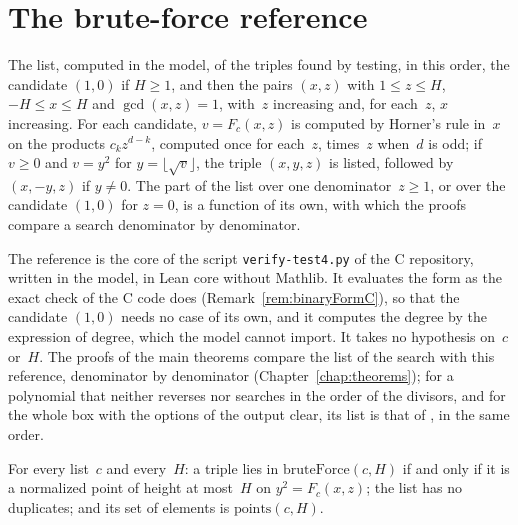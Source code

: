 \section{The brute-force reference}\label{sec:specBruteForce}

\begin{definition}\label{def:bruteForce}
  \leanok
  The list, computed in the model, of the triples found by testing, in this order, the candidate
  $(1, 0)$ if $H \ge 1$, and then the pairs $(x, z)$ with $1 \le z \le H$, $-H \le x \le H$ and
  $\gcd(x, z) = 1$, with~$z$ increasing and, for each~$z$, $x$ increasing. For each candidate,
  $v = F_c(x, z)$ is computed by Horner's rule in~$x$ on the products $c_k z^{d-k}$, computed once
  for each~$z$, times~$z$ when~$d$ is odd; if $v \ge 0$ and $v = y^2$ for
  $y = \lfloor \sqrt{v} \rfloor$, the triple $(x, y, z)$ is listed, followed by $(x, -y, z)$ if
  $y \ne 0$. The part of the list over one denominator~$z \ge 1$, or over the candidate $(1, 0)$
  for $z = 0$, is a function of its own, with which the proofs compare a search denominator by
  denominator.
\end{definition}

The reference is the core of the script \verb|verify-test4.py| of the C repository, written in the
model, in Lean core without Mathlib. It evaluates the form as the exact check of the C code does
(Remark~\ref{rem:binaryFormC}), so that the candidate $(1, 0)$ needs no case of its own, and it
computes the degree by the expression of $\mathrm{degree}$, which the model cannot import. It takes
no hypothesis on~$c$ or~$H$. The proofs of the main theorems compare the list of the search with
this reference, denominator by denominator (Chapter~\ref{chap:theorems}); for a polynomial that
\ratpoints{} neither reverses nor searches in the order of the divisors, and for the whole box with the
options of the output clear, its list is that of \ratpoints{}, in the same order.

\begin{theorem}\label{thm:bruteForce}
  \leanok
  For every list~$c$ and every~$H$: a triple lies in $\mathrm{bruteForce}(c, H)$ if and only if it
  is a normalized point of height at most~$H$ on $y^2 = F_c(x, z)$; the list has no duplicates; and
  its set of elements is $\mathrm{points}(c, H)$.
\end{theorem}

